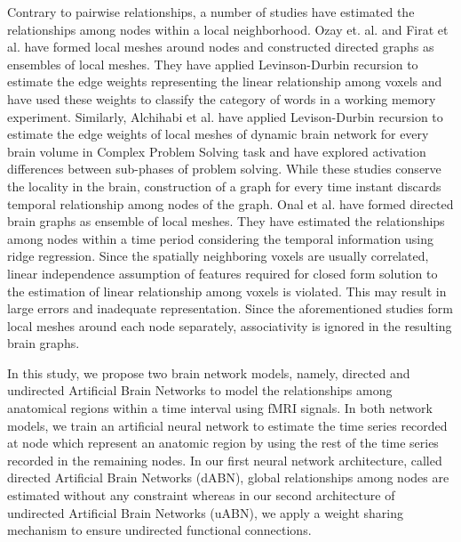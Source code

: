 \documentclass[runningheads]{llncs}
\begin{document}
Contrary to pairwise relationships, a number of studies have estimated the relationships among nodes within a local neighborhood. Ozay et. al. \cite{ozay2012mesh} and Firat et al. \cite{firat2013functional} have formed local meshes around nodes and constructed directed graphs as ensembles of local meshes. They have applied Levinson-Durbin recursion \cite{vaidyanathan2007theory} to estimate the edge weights representing the linear relationship among voxels and have used these weights to classify the category of words in a working memory experiment. Similarly, Alchihabi et al. \cite{alchihabi2018dynamic} have applied Levison-Durbin recursion to estimate the edge weights of local meshes of dynamic brain network for every brain volume in Complex Problem Solving task and have explored activation differences between sub-phases of problem solving. While these studies conserve the locality in the brain, construction of a graph for every time instant discards temporal relationship among nodes of the graph. Onal et al. \cite{onal2015modeling,onal2017new} have formed directed brain graphs as ensemble of local meshes. They have estimated the relationships among nodes within a time period considering the temporal information using ridge regression. Since the spatially neighboring voxels are usually correlated, linear independence assumption of features required for closed form solution to the estimation of linear relationship among voxels is violated. This  may result in large errors and inadequate representation. Since the aforementioned studies form local meshes around each node separately, associativity is ignored in the resulting brain graphs. 

In this study, we propose two brain network models, namely, directed and undirected Artificial Brain Networks to model the relationships among anatomical regions within a time interval using fMRI signals. In both network models, we train an artificial neural network to estimate the time series recorded at node which represent an anatomic region by using the rest of the time series recorded in the remaining nodes. In our first neural network architecture, called directed Artificial Brain Networks (dABN), global relationships among nodes are estimated without any constraint whereas in our second architecture of undirected Artificial Brain Networks (uABN), we apply a weight sharing mechanism to ensure undirected functional connections.


\end{document}
